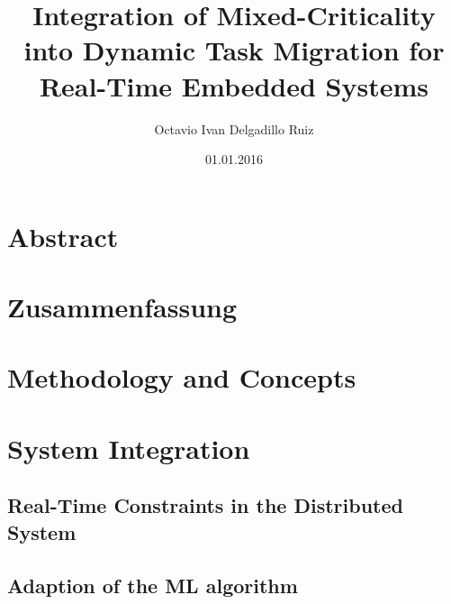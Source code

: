 \documentclass[%
]{tumDiss}
\title{%
  Integration of Mixed-Criticality into Dynamic Task Migration for Real-Time Embedded Systems
}
\author{Octavio Ivan Delgadillo Ruiz}
\date{01.01.2016}
\begin{document}
\frontmatter
\maketitle

\chapter{Abstract}

\lipsum[1-4]



\chapter{Zusammenfassung}

\lipsum[1-4]



\tableofcontents
\listoffigures
\listoftables
\printglossary[type=\acronymtype, nonumberlist]



\mainmatter







\chapter{Methodology and Concepts}







\chapter{System Integration}
\section{Real-Time Constraints in the Distributed System}
\section{Adaption of the ML algorithm}
\end{document}
